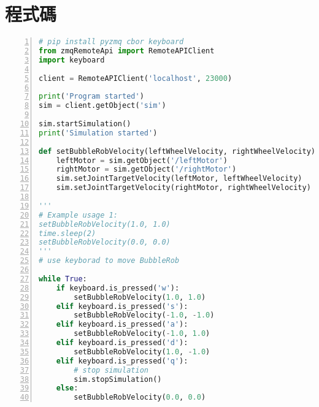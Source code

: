 \newpage

\section{程式碼}
\begin{lstlisting}[language=Python, frame=single, numbers=left, captionpos=b, basicstyle=\ttfamily\small,showstringspaces=false, breaklines=true, tabsize=4, xleftmargin=15pt]
# pip install pyzmq cbor keyboard
from zmqRemoteApi import RemoteAPIClient
import keyboard

client = RemoteAPIClient('localhost', 23000)

print('Program started')
sim = client.getObject('sim')

sim.startSimulation()
print('Simulation started')

def setBubbleRobVelocity(leftWheelVelocity, rightWheelVelocity):
    leftMotor = sim.getObject('/leftMotor')
    rightMotor = sim.getObject('/rightMotor')
    sim.setJointTargetVelocity(leftMotor, leftWheelVelocity)
    sim.setJointTargetVelocity(rightMotor, rightWheelVelocity)

'''
# Example usage 1:
setBubbleRobVelocity(1.0, 1.0)
time.sleep(2)
setBubbleRobVelocity(0.0, 0.0)
'''
# use keyborad to move BubbleRob

while True:
    if keyboard.is_pressed('w'):
        setBubbleRobVelocity(1.0, 1.0)
    elif keyboard.is_pressed('s'):
        setBubbleRobVelocity(-1.0, -1.0)
    elif keyboard.is_pressed('a'):
        setBubbleRobVelocity(-1.0, 1.0)
    elif keyboard.is_pressed('d'):
        setBubbleRobVelocity(1.0, -1.0)
    elif keyboard.is_pressed('q'):
        # stop simulation
        sim.stopSimulation()
    else:
        setBubbleRobVelocity(0.0, 0.0)
\end{lstlisting}
